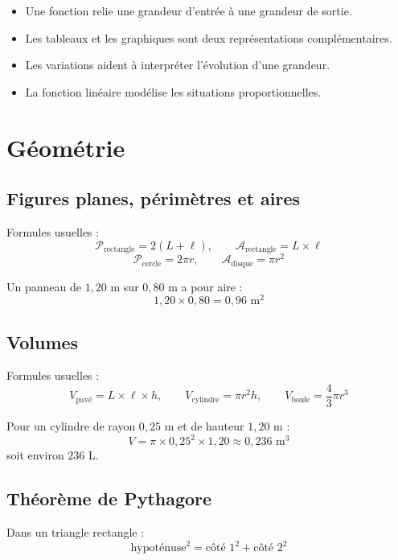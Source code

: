 \documentclass[11pt,a4paper,twoside]{book}
\begin{document}
\begin{retenirbox}
\begin{itemize}
\item Une fonction relie une grandeur d'entrée à une grandeur de sortie.
\item Les tableaux et les graphiques sont deux représentations complémentaires.
\item Les variations aident à interpréter l'évolution d'une grandeur.
\item La fonction linéaire modélise les situations proportionnelles.
\end{itemize}
\end{retenirbox}

\chapter{Géométrie}

\section{Figures planes, périmètres et aires}
\begin{definitionbox}
Formules usuelles :
\[
\mathcal{P}_{\text{rectangle}}=2(L+\ell), \qquad
\mathcal{A}_{\text{rectangle}}=L\times \ell
\]
\[
\mathcal{P}_{\text{cercle}}=2\pi r, \qquad
\mathcal{A}_{\text{disque}}=\pi r^2
\]
\end{definitionbox}

\begin{exemplebox}
Un panneau de \(1{,}20\) m sur \(0{,}80\) m a pour aire :
\[
1{,}20\times 0{,}80=0{,}96\text{ m}^2
\]
\end{exemplebox}

\section{Volumes}
\begin{definitionbox}
Formules usuelles :
\[
V_{\text{pavé}}=L\times \ell \times h,\qquad
V_{\text{cylindre}}=\pi r^2 h,\qquad
V_{\text{boule}}=\frac{4}{3}\pi r^3
\]
\end{definitionbox}

\begin{exemplebox}
Pour un cylindre de rayon \(0{,}25\) m et de hauteur \(1{,}20\) m :
\[
V=\pi \times 0{,}25^2 \times 1{,}20 \approx 0{,}236\text{ m}^3
\]
soit environ \(236\) L.
\end{exemplebox}

\section{Théorème de Pythagore}
\begin{definitionbox}
Dans un triangle rectangle :
\[
\text{hypoténuse}^2=\text{côté 1}^2+\text{côté 2}^2
\]
\end{definitionbox}
\end{document}
